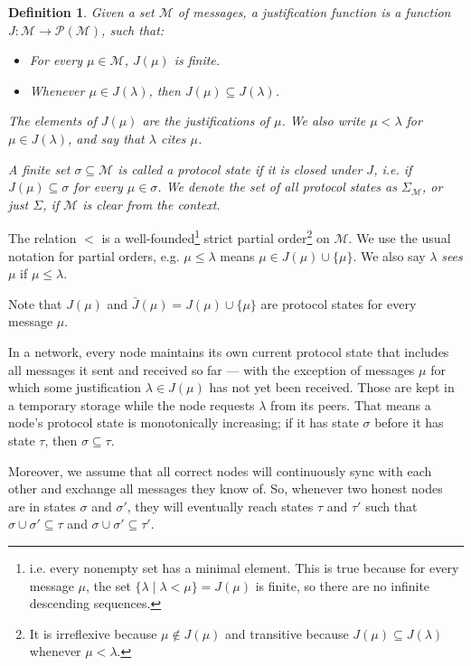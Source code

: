 \documentclass[12pt, fleqn]{article}
\newtheorem{definition}{Definition}
\begin{document}
\begin{definition}
  Given a set $\mathcal{M}$ of \emph{messages}, a \emph{justification function} is a function $J: \mathcal{M} \rightarrow \mathcal{P}(\mathcal{M})$, such that:
  \begin{itemize}
    \item For every $\mu \in \mathcal{M}$, $J(\mu)$ is finite.
    \item Whenever $\mu \in J(\lambda)$, then $J(\mu) \subseteq J(\lambda)$.
  \end{itemize}
  The elements of $J(\mu)$ are the \emph{justifications} of $\mu$. We also write $\mu < \lambda$ for $\mu \in J(\lambda)$, and say that $\lambda$ \emph{cites} $\mu$.

  A finite set $\sigma \subseteq \mathcal{M}$ is called a \emph{protocol state} if it is closed under $J$, i.e. if $J(\mu) \subseteq \sigma$ for every $\mu \in \sigma$. We denote the set of all protocol states as $\Sigma_{\mathcal{M}}$, or just $\Sigma$, if $\mathcal{M}$ is clear from the context.
\end{definition}

The relation $<$ is a well-founded\footnote{i.e. every nonempty set has a minimal element. This is true because for every message $\mu$, the set $\{ \lambda \mid \lambda < \mu \} = J(\mu)$ is finite, so there are no infinite descending sequences.} strict partial order\footnote{It is irreflexive because $\mu \notin J(\mu)$ and transitive because $J(\mu) \subseteq J(\lambda)$ whenever $\mu < \lambda$.} on $\mathcal{M}$. We use the usual notation for partial orders, e.g. $\mu \leq \lambda$ means $\mu \in J(\mu) \cup \{\mu\}$. We also say $\lambda$ \emph{sees} $\mu$ if $\mu \leq \lambda$.

Note that $J(\mu)$ and $\bar{J}(\mu) = J(\mu) \cup \{\mu\}$ are protocol states for every message $\mu$.

In a network, every node maintains its own current protocol state that includes all messages it sent and received so far --- with the exception of messages $\mu$ for which some justification $\lambda \in J(\mu)$ has not yet been received. Those are kept in a temporary storage while the node requests $\lambda$ from its peers. That means a node's protocol state is monotonically increasing; if it has state $\sigma$ before it has state $\tau$, then $\sigma \subseteq \tau$.

Moreover, we assume that all correct nodes will continuously sync with each other and exchange all messages they know of. So, whenever two honest nodes are in states $\sigma$ and $\sigma'$, they will eventually reach states $\tau$ and $\tau'$ such that $\sigma \cup \sigma' \subseteq \tau$ and $\sigma \cup \sigma' \subseteq \tau'$.
\end{document}
